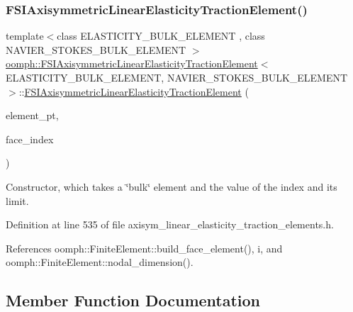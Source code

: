 \subsubsection{\texorpdfstring{F\+S\+I\+Axisymmetric\+Linear\+Elasticity\+Traction\+Element()}{FSIAxisymmetricLinearElasticityTractionElement()}}
{\footnotesize\ttfamily template$<$class E\+L\+A\+S\+T\+I\+C\+I\+T\+Y\+\_\+\+B\+U\+L\+K\+\_\+\+E\+L\+E\+M\+E\+NT , class N\+A\+V\+I\+E\+R\+\_\+\+S\+T\+O\+K\+E\+S\+\_\+\+B\+U\+L\+K\+\_\+\+E\+L\+E\+M\+E\+NT $>$ \\
\hyperlink{classoomph_1_1FSIAxisymmetricLinearElasticityTractionElement}{oomph\+::\+F\+S\+I\+Axisymmetric\+Linear\+Elasticity\+Traction\+Element}$<$ E\+L\+A\+S\+T\+I\+C\+I\+T\+Y\+\_\+\+B\+U\+L\+K\+\_\+\+E\+L\+E\+M\+E\+NT, N\+A\+V\+I\+E\+R\+\_\+\+S\+T\+O\+K\+E\+S\+\_\+\+B\+U\+L\+K\+\_\+\+E\+L\+E\+M\+E\+NT $>$\+::\hyperlink{classoomph_1_1FSIAxisymmetricLinearElasticityTractionElement}{F\+S\+I\+Axisymmetric\+Linear\+Elasticity\+Traction\+Element} (\begin{DoxyParamCaption}\item[{\hyperlink{classoomph_1_1FiniteElement}{Finite\+Element} $\ast$const \&}]{element\+\_\+pt,  }\item[{const int \&}]{face\+\_\+index }\end{DoxyParamCaption})\hspace{0.3cm}{\ttfamily [inline]}}



Constructor, which takes a \char`\"{}bulk\char`\"{} element and the value of the index and its limit. 



Definition at line 535 of file axisym\+\_\+linear\+\_\+elasticity\+\_\+traction\+\_\+elements.\+h.



References oomph\+::\+Finite\+Element\+::build\+\_\+face\+\_\+element(), i, and oomph\+::\+Finite\+Element\+::nodal\+\_\+dimension().



\subsection{Member Function Documentation}
\mbox{\label{classoomph_1_1FSIAxisymmetricLinearElasticityTractionElement_ac2ec9591abe96af1cc68da123c554feb}} 
